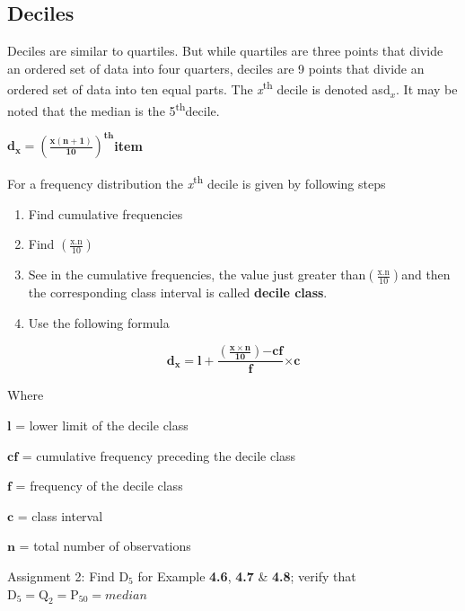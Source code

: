 \documentclass[
]{book}
\begin{document}
\subsection{Deciles}\label{deciles}

Deciles are similar to quartiles. But while quartiles are three points
that divide an ordered set of data into four quarters, deciles are 9
points that divide an ordered set of data into ten equal parts. The
\emph{x}\textsuperscript{th} decile is denoted as\(\text{d}_{x}\). It may be noted that the
median is the 5\textsuperscript{th}decile.

\(\mathbf{d}_{\mathbf{x}}\mathbf{=}\left( \frac{\mathbf{x}\left( \mathbf{n + 1} \right)}{\mathbf{10}} \right)^{\mathbf{\text{th}}}\)\textbf{item}

For a frequency distribution the \emph{x}\textsuperscript{th} decile is given by following
steps

\begin{enumerate}
\def\labelenumi{\arabic{enumi}.}
\item
  Find cumulative frequencies
\item
  Find \(\left( \frac{\text{x.n}}{10} \right)\)
\item
  See in the cumulative frequencies, the value just greater
  than\(\left( \frac{\text{x.n}}{10} \right)\)and then the corresponding
  class interval is called \textbf{decile class}.
\item
  Use the following formula
\end{enumerate}

\[\mathbf{d}_{\mathbf{x}}\mathbf{= l +}\frac{\left( \frac{\mathbf{x \times n}}{\mathbf{10}} \right)\mathbf{- cf}}{\mathbf{f}}\mathbf{\times c}\]

Where

\(\mathbf{l}\) = lower limit of the decile class

\(\mathbf{\text{cf}}\) = cumulative frequency preceding the decile class

\(\mathbf{f}\) = frequency of the decile class

\(\mathbf{c}\) = class interval

\(\mathbf{n}\) = total number of observations

\begin{rmdnote}
Assignment 2: Find \(\text{D}_{5}\) for Example \textbf{4.6}, \textbf{4.7} \&
\textbf{4.8}; verify that
\(\text{D}_{5} = \text{Q}_{2} = \text{P}_{50} = median\)
\end{rmdnote}
\end{document}
